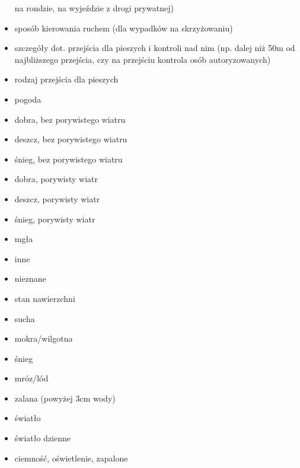 \begin{itemize}
  na rondzie, na wyjeździe z drogi prywatnej)\\
\item
  sposób kierowania ruchem (dla wypadków na skrzyżowaniu)\\
\item
  szczegóły dot. przejścia dla pieszych i kontroli nad nim (np. dalej
  niż 50m od najbliższego przejścia, czy na przejściu kontrola osób
  autoryzowanych)\\
\item
  rodzaj przejścia dla pieszych\\
\item
  pogoda\\
\item
  dobra, bez porywistego wiatru\\
\item
  deszcz, bez porywistego wiatru\\
\item
  śnieg, bez porywistego wiatru\\
\item
  dobra, porywisty wiatr\\
\item
  deszcz, porywisty wiatr\\
\item
  śnieg, porywisty wiatr\\
\item
  mgła\\
\item
  inne\\
\item
  nieznane\\
\item
  stan nawierzchni\\
\item
  sucha\\
\item
  mokra/wilgotna\\
\item
  śnieg\\
\item
  mróz/lód\\
\item
  zalana (powyżej 3cm wody)\\
\item
  światło\\
\item
  światło dzienne\\
\item
  ciemność, oświetlenie, zapalone\\

\end{itemize}
